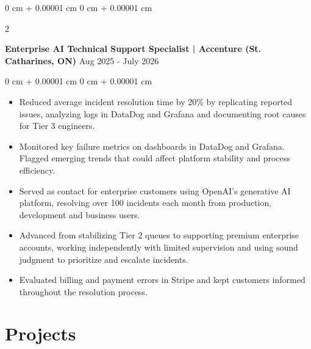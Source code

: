 \documentclass[10pt, letterpaper]{article}
\newenvironment{highlights}{
    \begin{itemize}[
        topsep=0.10 cm,
        parsep=0.10 cm,
        partopsep=0pt,
        itemsep=0pt,
        leftmargin=0 cm + 10pt
    ]
}{
    \end{itemize}
} %
\newenvironment{onecolentry}{
    \begin{adjustwidth}{
        0 cm + 0.00001 cm
    }{
        0 cm + 0.00001 cm
    }
}{
    \end{adjustwidth}
} %
\newenvironment{twocolentry}[2][]{
    \onecolentry
    \def\secondColumn{#2}
    \setcolumnwidth{\fill, 4.5 cm}
    \begin{paracol}{2}
}{
    \switchcolumn \raggedleft \secondColumn
    \end{paracol}
    \endonecolentry
} %
\begin{document}
        \begin{twocolentry}{
            {Aug 2025 - July 2026}
        }
            \textbf{Enterprise AI Technical Support Specialist | Accenture (St. Catharines, ON)}\end{twocolentry}
        \vspace{0.10 cm}
        \begin{onecolentry}
            \begin{highlights}
                \item Reduced average incident resolution time by 20\% by replicating reported issues, analyzing logs in DataDog and Grafana and documenting root causes for Tier 3 engineers.
                \item Monitored key failure metrics on dashboards in DataDog and Grafana. Flagged emerging trends that could affect platform stability and process efficiency.
                \item Served as contact for enterprise customers using OpenAI’s generative AI platform, resolving over 100 incidents each month from production, development and business users.
                \item Advanced from stabilizing Tier 2 queues to supporting premium enterprise accounts, working independently with limited supervision and using sound judgment to prioritize and escalate incidents.
                \item Evaluated billing and payment errors in Stripe and kept customers informed throughout the resolution process.
            \end{highlights}
        \end{onecolentry}

    \section{Projects}
\end{document}
